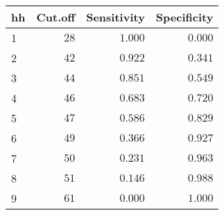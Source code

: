 \begin{table}[!tbp]
\begin{center}
\begin{tabular}{lrrr}
\hline\hline
\multicolumn{1}{l}{hh}&\multicolumn{1}{c}{Cut.off}&\multicolumn{1}{c}{Sensitivity}&\multicolumn{1}{c}{Specificity}\tabularnewline
\hline
1&$28$&$1.000$&$0.000$\tabularnewline
2&$42$&$0.922$&$0.341$\tabularnewline
3&$44$&$0.851$&$0.549$\tabularnewline
4&$46$&$0.683$&$0.720$\tabularnewline
5&$47$&$0.586$&$0.829$\tabularnewline
6&$49$&$0.366$&$0.927$\tabularnewline
7&$50$&$0.231$&$0.963$\tabularnewline
8&$51$&$0.146$&$0.988$\tabularnewline
9&$61$&$0.000$&$1.000$\tabularnewline
\hline
\end{tabular}\end{center}

\end{table}
